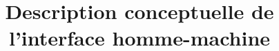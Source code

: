 
\setcounter{tocdepth}{0}
\title{Description conceptuelle de l'interface homme-machine}


    \maketitle
    \tableofcontents
    

